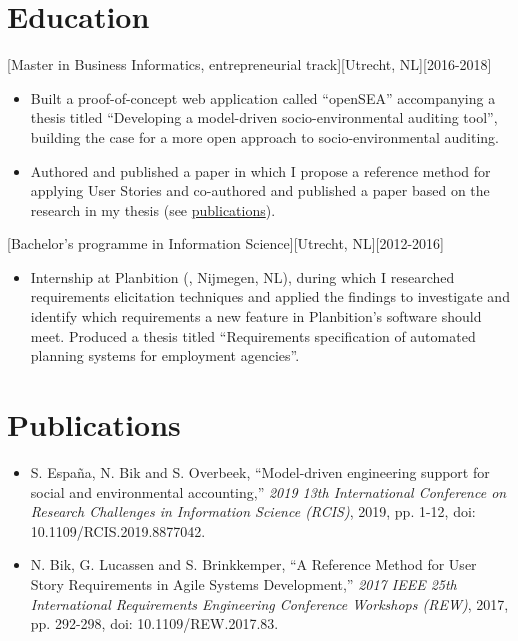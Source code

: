 \documentclass[10pt]{article}
\begin{document}
\section{Education}
\label{sec:school}

[Master in Business Informatics, entrepreneurial track][Utrecht, NL][2016-2018]
\begin{itemize}
    \item Built a proof-of-concept web application called \enquote{openSEA} accompanying a thesis titled \enquote{Developing a model-driven socio-environmental auditing tool}, building the case for a more open approach to socio-environmental auditing.
    \item Authored and published a paper in which I propose a reference method for applying User Stories and co-authored and published a paper based on the research in my thesis (see \hyperref[sec:pubs]{publications}).
\end{itemize}

[Bachelor's programme in Information Science][Utrecht, NL][2012-2016]
\begin{itemize}
    \item Internship at Planbition (, Nijmegen, NL), during which I researched requirements elicitation techniques and applied the findings to investigate and identify which requirements a new feature in Planbition's software should meet. Produced a thesis titled \enquote{Requirements specification of automated planning systems for employment agencies}.
\end{itemize}

\section{Publications}
\label{sec:pubs}

\begin{itemize}
    \item S. España, N. Bik and S. Overbeek, \enquote{Model-driven engineering support for social and environmental accounting,} \textit{2019 13th International Conference on Research Challenges in Information Science (RCIS)}, 2019, pp. 1-12, doi:\\ 10.1109/RCIS.2019.8877042.
    \item N. Bik, G. Lucassen and S. Brinkkemper, \enquote{A Reference Method for User Story Requirements in Agile Systems Development,} \textit{2017 IEEE 25th International Requirements Engineering Conference Workshops (REW)}, 2017, pp. 292-298, doi: 10.1109/REW.2017.83.
\end{itemize}
\end{document}

